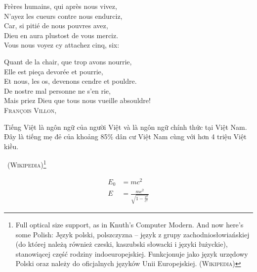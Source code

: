 \documentclass[12pt,letterpaper]{article}
\begin{document}
\begin{otherlanguage}{french}
Frères humains, qui après nous vivez,\\
N'ayez les cueurs contre nous endurciz,\\
Car, si pitié de nous pouvres avez,\\
Dieu en aura plustost de vous merciz.\\
Vous nous voyez cy attachez cinq, six:

\noindent Quant de la chair, que trop avons nourrie,\\
Elle est pieça devorée et pourrie,\\
Et nous, les os, devenons cendre et pouldre.\\
De nostre mal personne ne s'en rie,\\
Mais priez Dieu que tous nous vueille absouldre!\\

\noindent \textsc{François Villon}, \\

\end{otherlanguage}

\begin{otherlanguage}{vietnamese}
Tiếng Việt là ngôn ngữ của người Việt và là ngôn ngữ chính thức tại Việt Nam. Đây là tiếng mẹ đẻ của khoảng 85\% dân cư Việt Nam cùng với hơn 4 triệu Việt kiều.\end{otherlanguage}\ (\textsc{Wikipedia})\footnote{Full optical size support, as in Knuth's Computer Modern. And now here's some Polish: \foreignlanguage{polish}{Język polski, polszczyzna – język z grupy zachodniosłowiańskiej (do której należą również czeski, kaszubski słowacki i języki łużyckie), stanowiącej część rodziny indoeuropejskiej. Funkcjonuje jako język urzędowy Polski oraz należy do oficjalnych języków Unii Europejskiej.} (\textsc{Wikipedia})}

\begin{align}
E_0 &= mc^2 \\
E &= \frac{mc^2}{\sqrt{1-\frac{v^2}{c^2}}}
\end{align}
\end{document}
